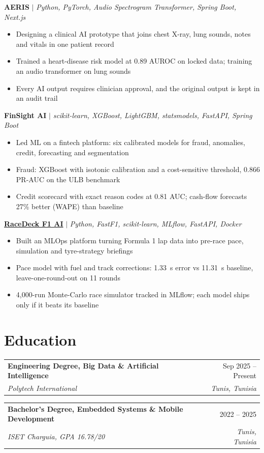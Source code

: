 \documentclass[a4paper,11pt]{article}
\makeatletter
\newcommand{\role}[4]{%
  \begin{tabular*}{\linewidth}{l@{\extracolsep{\fill}}r}
    \textbf{#1} & #2 \\
    \textit{#3} & \textit{#4} \\
  \end{tabular*}\par}
\newenvironment{points}{\begin{itemize}[leftmargin=1.4em,itemsep=1pt,topsep=2pt,parsep=0pt]\small}{\end{itemize}\vspace{4pt}}
\newcommand{\proj}[2]{\textbf{#1} $|$ \textit{\small #2}\par}
\newcommand{\gap}{\vspace{4pt}}
\makeatother
\begin{document}
\proj{AERIS}{Python, PyTorch, Audio Spectrogram Transformer, Spring Boot, Next.js}
\begin{points}
  \item Designing a clinical AI prototype that joins chest X-ray, lung sounds, notes and vitals in one patient record
  \item Trained a heart-disease risk model at 0.89 AUROC on locked data; training an audio transformer on lung sounds
  \item Every AI output requires clinician approval, and the original output is kept in an audit trail
\end{points}
\proj{FinSight AI}{scikit-learn, XGBoost, LightGBM, statsmodels, FastAPI, Spring Boot}
\begin{points}
  \item Led ML on a fintech platform: six calibrated models for fraud, anomalies, credit, forecasting and segmentation
  \item Fraud: XGBoost with isotonic calibration and a cost-sensitive threshold, 0.866 PR-AUC on the ULB benchmark
  \item Credit scorecard with exact reason codes at 0.81 AUC; cash-flow forecasts 27\% better (WAPE) than baseline
\end{points}
\proj{\href{https://github.com/ChedyKorbi/RACEDECK_F1_AI}{RaceDeck F1 AI}}{Python, FastF1, scikit-learn, MLflow, FastAPI, Docker}
\begin{points}
  \item Built an MLOps platform turning Formula 1 lap data into pre-race pace, simulation and tyre-strategy briefings
  \item Pace model with fuel and track corrections: 1.33~s error vs 11.31~s baseline, leave-one-round-out on 11 rounds
  \item 4,000-run Monte-Carlo race simulator tracked in MLflow; each model ships only if it beats its baseline
\end{points}

\section{Education}
\role{Engineering Degree, Big Data \& Artificial Intelligence}{Sep 2025 -- Present}{Polytech International}{Tunis, Tunisia}
\gap
\role{Bachelor's Degree, Embedded Systems \& Mobile Development}{2022 -- 2025}{ISET Charguia, GPA 16.78/20}{Tunis, Tunisia}
\end{document}

